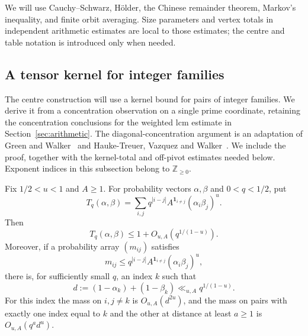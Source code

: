 We will use Cauchy--Schwarz, H\"older, the Chinese remainder theorem,
Markov's inequality, and finite orbit averaging. Size parameters and
vertex totals in independent arithmetic estimates are local to those
estimates; the centre and table notation is introduced only when needed.

\subsection{A tensor kernel for integer families}

The centre construction will use a kernel bound for pairs of integer
families. We derive it from a concentration observation on a single prime
coordinate, retaining the concentration conclusions for the weighted lcm
estimate in Section~\ref{sec:arithmetic}.
The diagonal-concentration argument is an adaptation of Green and
Walker~\cite[Lemma~2.1]{GW2021} and Hauke-Treuer, Vazquez and
Walker~\cite[Lemma~3.2]{HVW2026}. We include the proof, together with
the kernel-total and off-pivot estimates needed below.
Exponent indices in this subsection belong to $\mathbb Z_{\ge0}$.

\begin{lemma}\label{ar:pivot}
Fix $1/2<u<1$ and $A\ge1$. For probability vectors $\alpha,\beta$ and
$0<q<1/2$, put
\[
 T_q(\alpha,\beta)=\sum_{i,j}
 q^{|i-j|}A^{\mathbf1_{i\ne j}}(\alpha_i\beta_j)^u.
\]
Then
\[
 T_q(\alpha,\beta)\le 1+O_{u,A}(q^{1/(1-u)}).
\]
Moreover, if a probability array $(m_{ij})$ satisfies
\[
 m_{ij}\le q^{|i-j|}A^{\mathbf1_{i\ne j}}
 (\alpha_i\beta_j)^u,
\]
there is, for sufficiently small $q$, an index $k$ such that
\[
 d:=(1-\alpha_k)+(1-\beta_k)\ll_{u,A}q^{1/(1-u)}.
\]
For this index the mass on $i,j\ne k$ is $O_{u,A}(d^{2u})$, and the mass
on pairs with exactly one index equal to $k$ and the other at distance at
least $a\ge1$ is $O_{u,A}(q^a d^u)$.
\end{lemma}

